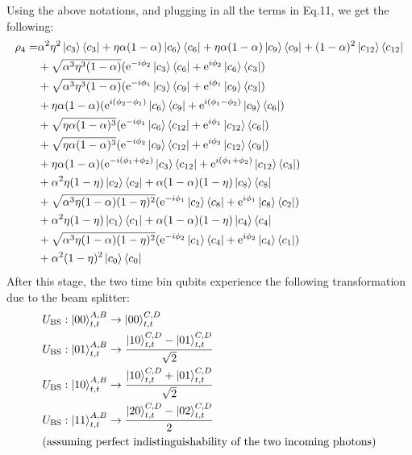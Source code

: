 Using the above notations, and plugging in all the terms in Eq.11, we get the following:
\begin{align}
    \rho_{4} =& \alpha^2\eta^2\ket{c_3}\bra{c_3} + \eta\alpha(1-\alpha)\ket{c_6}\bra{c_6} + \eta\alpha(1-\alpha)\ket{c_9}\bra{c_9} + (1-\alpha)^2\ket{c_{12}}\bra{c_{12}}\nonumber\\
    &+ \sqrt{\alpha^3\eta^{3}(1-\alpha)}(\text{e}^{-i\phi_{2}}\ket{c_3}\bra{c_6} + \text{e}^{i\phi_{2}}\ket{c_6}\bra{c_3}) \nonumber\\
    &+ \sqrt{\alpha^3\eta^{3}(1-\alpha)}(\text{e}^{-i\phi_{1}}\ket{c_3}\bra{c_9} + \text{e}^{i\phi_{1}}\ket{c_9}\bra{c_3})\nonumber\\
    &+ \eta\alpha(1-\alpha)(\text{e}^{i(\phi_{2}-\phi_{1})}\ket{c_6}\bra{c_9} + \text{e}^{i(\phi_{1}-\phi_{2})}\ket{c_9}\bra{c_6}) \nonumber\\
    &+ \sqrt{\eta\alpha(1-\alpha)^3}(\text{e}^{-i\phi_{1}}\ket{c_6}\bra{c_{12}} + \text{e}^{i\phi_{1}}\ket{c_{12}}\bra{c_6})\nonumber\\
    &+ \sqrt{\eta\alpha(1-\alpha)^3}(\text{e}^{-i\phi_{2}}\ket{c_9}\bra{c_{12}} + \text{e}^{i\phi_{2}}\ket{c_{12}}\bra{c_9}) \nonumber\\
    &+ \eta\alpha(1-\alpha)(\text{e}^{-i(\phi_{1}+\phi_{2})}\ket{c_3}\bra{c_{12}} + \text{e}^{i(\phi_{1}+\phi_{2})}\ket{c_{12}}\bra{c_3})\nonumber\\
    &+ \alpha^2\eta(1-\eta)\ket{c_2}\bra{c_2} + \alpha(1-\alpha)(1-\eta)\ket{c_8}\bra{c_8} \nonumber\\
    &+ \sqrt{\alpha^3\eta(1-\alpha)(1-\eta)^2}(\text{e}^{-i\phi_{1}}\ket{c_2}\bra{c_8} + \text{e}^{i\phi_{1}}\ket{c_8}\bra{c_2})\nonumber\\
    &+ \alpha^2\eta(1-\eta)\ket{c_1}\bra{c_1} + \alpha(1-\alpha)(1-\eta)\ket{c_4}\bra{c_4} \nonumber\\
    &+ \sqrt{\alpha^3\eta(1-\alpha)(1-\eta)^2}(\text{e}^{-i\phi_{2}}\ket{c_1}\bra{c_4} + \text{e}^{i\phi_{2}}\ket{c_4}\bra{c_1})\nonumber\\
    &+ \alpha^2(1-\eta)^2\ket{c_0}\bra{c_0}
\end{align}
After this stage, the two time bin qubits experience the following transformation due to the beam splitter:
\begin{subequations}
    \begin{align}
        &U_{\text{BS}}:\ket{00}^{A,B}_{t,t}\to \ket{00}^{C,D}_{t,t}\\
        &U_{\text{BS}}:\ket{01}^{A,B}_{t,t}\to \frac{\ket{10}^{C,D}_{t,t}-\ket{01}^{C,D}_{t,t}}{\sqrt{2}}\\
        &U_{\text{BS}}:\ket{10}^{A,B}_{t,t}\to \frac{\ket{10}^{C,D}_{t,t}+\ket{01}^{C,D}_{t,t}}{\sqrt{2}}\\
        &U_{\text{BS}}:\ket{11}^{A,B}_{t,t}\to \frac{\ket{20}^{C,D}_{t,t}-\ket{02}^{C,D}_{t,t}}{2}\\
        &(\text{assuming perfect indistinguishability of the two incoming photons})\nonumber
    \end{align}
\end{subequations}
